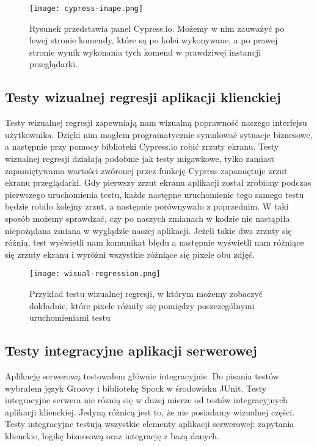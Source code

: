 \begin{figure}
    \texttt{[image: cypress-imape.png]}
    \caption{Rysunek przedstawia panel Cypress.io. Możemy w nim zauważyć po lewej stronie komendy, które są po kolei wykonywane, a po prawej stronie wynik wykonania tych komend w prawdziwej instancji przeglądarki.} \label{fig-cypress}
\end{figure}

\subsection{Testy wizualnej regresji aplikacji klienckiej}
Testy wizualnej regresji zapewniają nam wizualną poprawność naszego interfejsu użytkownika. Dzięki nim mogłem programatycznie symulować sytuacje biznesowe, a następnie przy pomocy biblioteki Cypress.io robić zrzuty ekranu. Testy wizualnej regresji działają podobnie jak testy migawkowe, tylko zamiast zapamiętywania wartości zwóronej przez funkcję Cypress zapamiętuje zrzut ekranu przeglądarki. Gdy pierwszy zrzut ekranu aplikacji został zrobiony podczas pierwszego uruchomienia testu, każde następne uruchomienie tego samego testu będzie robiło kolejny zrzut, a następnie porównywało z poprzednim. W taki sposób możemy sprawdzać, czy po naszych zmianach w kodzie nie nastąpiła niepożądana zmiana w wyglądzie naszej aplikacji. Jeżeli takie dwa zrzuty się różnią, test wyświetli nam komunikat błędu a następnie wyświetli nam różniące się zrzuty ekranu i wyróżni wszystkie różniące się pixele obu zdjęć.

\begin{figure}
    \texttt{[image: wisual-regression.png]}
    \caption{Przykład testu wizualnej regresji, w którym możemy zobaczyć dokładnie, które pixele różniły się pomiędzy poszczególnymi uruchomieniami testu} \label{fig-cypress-vr}
\end{figure}


\subsection{Testy integracyjne aplikacji serwerowej}
Aplikację serwerową testowałem głównie integracyjnie. Do pisania testów wybrałem język Groovy i bibliotekę Spock w środowisku JUnit. Testy integracyjne serwera nie róznią się w dużej mierze od testów integracyjnych aplikacji klienckiej. Jedyną różnicą jest to, że nie posiadamy wizualnej części. Testy integracyjne testują wszystkie elementy aplikacji serwerowej: zapytania klienckie, logikę biznesową oraz integrację z bazą danych.
